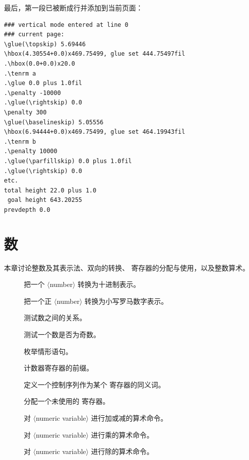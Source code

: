 \documentclass[a4paper]{rapport3}
\def\gr#1{$\langle$#1$\rangle$}\def\key#1{{\tt#1}}
\newenvironment{inventory}{\begin{description}}{\end{description}}
\begin{document}
最后，第一段已被断成行并添加到当前页面：\begin{verbatim}
### vertical mode entered at line 0
### current page:
\glue(\topskip) 5.69446
\hbox(4.30554+0.0)x469.75499, glue set 444.75497fil
.\hbox(0.0+0.0)x20.0
.\tenrm a
.\glue 0.0 plus 1.0fil
.\penalty -10000
.\glue(\rightskip) 0.0
\penalty 300
\glue(\baselineskip) 5.05556
\hbox(6.94444+0.0)x469.75499, glue set 464.19943fil
.\tenrm b
.\penalty 10000
.\glue(\parfillskip) 0.0 plus 1.0fil
.\glue(\rightskip) 0.0
etc.
total height 22.0 plus 1.0
 goal height 643.20255
prevdepth 0.0
\end{verbatim}




\endofchapter
\chapter{数}\label{number}

本章讨论整数及其表示法、双向的转换、 寄存器的分配与使用，以及整数算术。

\begin{inventory} 
\item []
      把一个 \gr{number} 转换为十进制表示。

\item []
      把一个正 \gr{number} 转换为小写罗马数字表示。

\item []
      测试数之间的关系。

\item []
      测试一个数是否为奇数。

\item []
      枚举情形语句。


\item []
      计数器寄存器的前缀。

\item []
      定义一个控制序列作为某个  寄存器的同义词。

\item []
      分配一个未使用的  寄存器。

\item []
      对 \gr{numeric variable} 进行加或减的算术命令。

\item []
      对 \gr{numeric variable} 进行乘的算术命令。

\item []
      对 \gr{numeric variable} 进行除的算术命令。

\end{inventory}
\end{document}
